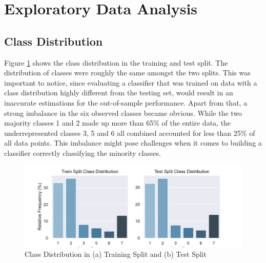 \section{Exploratory Data Analysis}


\subsection{Class Distribution}
Figure \ref{class_distribution} shows the class distribution in the training and test split. The distribution of classes were roughly the same amongst the two splits. This was important to notice, since evaluating a classifier that was trained on data with a class distribution highly different from the testing set, would result in an inaccurate estimations for the out-of-sample performance.
Apart from that, a strong imbalance in the six observed classes became obvious. While the two majority classes 1 and 2 made up more than 65\% of the entire data, the underrepresented classes 3, 5 and 6 all combined accounted for less than 25\% of all data points. This imbalance might pose challenges when it comes to building a classifier correctly classifying the minority classes. 
\newline

\begin{figure}[ht]
\centering
\includegraphics[scale=0.6]{figures/class_distribution.pdf}
\caption{Class Distribution in (a) Training Split and (b) Test Split}
\captionsetup{justification=centering,margin=2cm}
\label{class_distribution}
\end{figure}

